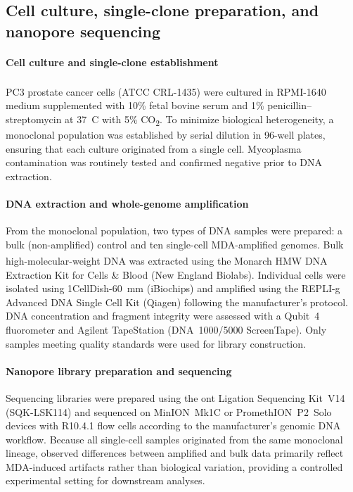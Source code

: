 \documentclass[pdflatex,sn-nature,lineno]{sn-jnl}%
\theoremstyle{thmstyleone}%
\theoremstyle{thmstyletwo}%
\theoremstyle{thmstylethree}%
\begin{document}
\subsection*{Cell culture, single-clone preparation, and nanopore sequencing}

\paragraph{Cell culture and single-clone establishment}
PC3 prostate cancer cells (ATCC\textsuperscript{\textregistered} CRL-1435\texttrademark) were cultured in RPMI-1640 medium supplemented with 10\% fetal bovine serum and 1\% penicillin--streptomycin at 37~\textdegree C with 5\% CO\textsubscript{2}. To minimize biological heterogeneity, a monoclonal population was established by serial dilution in 96-well plates, ensuring that each culture originated from a single cell. Mycoplasma contamination was routinely tested and confirmed negative prior to DNA extraction.

\paragraph{DNA extraction and whole-genome amplification}
From the monoclonal population, two types of DNA samples were prepared: a bulk (non-amplified) control and ten single-cell MDA-amplified genomes. Bulk high-molecular-weight DNA was extracted using the Monarch\textsuperscript{\textregistered} HMW DNA Extraction Kit for Cells \& Blood (New England Biolabs). Individual cells were isolated using 1CellDish-60~mm (iBiochips) and amplified using the REPLI-g Advanced DNA Single Cell Kit (Qiagen) following the manufacturer's protocol. DNA concentration and fragment integrity were assessed with a Qubit~4 fluorometer and Agilent TapeStation (DNA~1000/5000 ScreenTape). Only samples meeting quality standards were used for library construction.

\paragraph{Nanopore library preparation and sequencing}
Sequencing libraries were prepared using the \gls{ont} Ligation Sequencing Kit~V14 (SQK-LSK114) and sequenced on MinION~Mk1C or PromethION~P2~Solo devices with R10.4.1 flow cells according to the manufacturer's genomic DNA workflow. Because all single-cell samples originated from the same monoclonal lineage, observed differences between amplified and bulk data primarily reflect MDA-induced artifacts rather than biological variation, providing a controlled experimental setting for downstream analyses.
\end{document}
